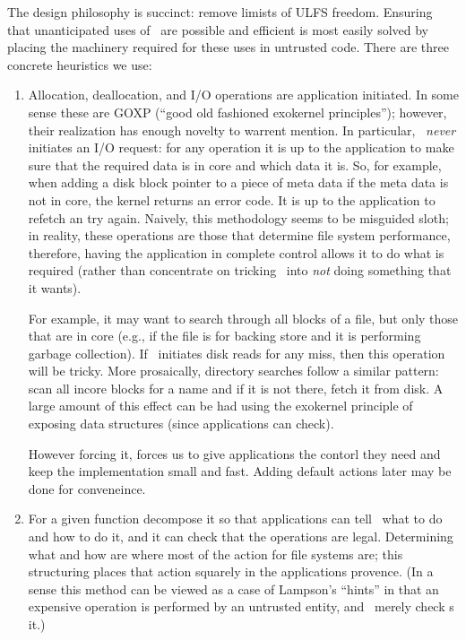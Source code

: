 The design philosophy is succinct: remove limists of ULFS freedom.  Ensuring
that unanticipated uses of \xxx\ are possible and efficient is most
easily solved by placing the machinery required for these uses in
untrusted code.  There are three concrete heuristics we use:
\begin{enumerate}

	\item Allocation, deallocation, and I/O operations are
	application initiated.  In some sense these are GOXP (``good
	old fashioned exokernel principles''); however, their
	realization has enough novelty to warrent mention.  In
	particular, \xxx\ {\em never} initiates an I/O request:  for
	any operation it is up to the application to make sure that the
	required data is in core and which data it is.  So, for
	example, when adding a disk block pointer to a piece of meta
	data if the meta data is not in core, the kernel returns an
	error code.  It is up to the application to refetch an try
	again.  Naively, this methodology seems to be misguided sloth;
	in reality, these operations are those that determine file
	system performance, therefore, having the application in
	complete control allows it to do what is required (rather than
	concentrate on tricking \xxx\ into {\em not} doing something
	that it wants).    
	
	For example, it may want to search through all blocks of 
	a file, but only those that are in core (e.g., if the file
	is for backing store and it is performing garbage collection).
	If \xxx\ initiates disk reads for any miss, then this operation
	will be tricky.  More prosaically, directory searches follow
	a similar pattern: scan all incore blocks for a name and if it
	is not there, fetch it from disk.  A large amount of this
	effect can be had using the exokernel principle of exposing
	data structures (since applications can check).  

	However forcing it, forces us to give applications the contorl
	they need and keep the implementation small and fast.   Adding
	default actions later may be done for conveneince.

	\item For a given function decompose it so that applications
	can tell \xxx\ what to do and how to do it, and it can check
	that the operations are legal.  Determining what and how 
	are where most of the action for file systems are; this 
	structuring places that action squarely in the applications
	provence.  (In a sense this method can be viewed as a
	case of Lampson's ``hints'' in that an expensive operation
	is performed by an untrusted entity, and \xxx\ merely check
	s it.)


\end{enumerate}
